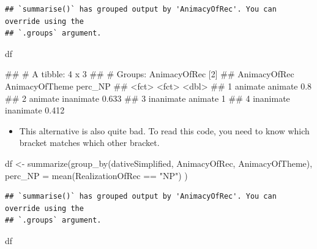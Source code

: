 \documentclass[
]{book}
\newenvironment{Shaded}{\begin{snugshade}}{\end{snugshade}}
\newcommand{\AttributeTok}[1]{\textcolor[rgb]{0.77,0.63,0.00}{#1}}
\newcommand{\FunctionTok}[1]{\textcolor[rgb]{0.00,0.00,0.00}{#1}}
\newcommand{\NormalTok}[1]{#1}
\newcommand{\OtherTok}[1]{\textcolor[rgb]{0.56,0.35,0.01}{#1}}
\newcommand{\SpecialCharTok}[1]{\textcolor[rgb]{0.00,0.00,0.00}{#1}}
\newcommand{\StringTok}[1]{\textcolor[rgb]{0.31,0.60,0.02}{#1}}
\providecommand{\tightlist}{%
  \setlength{\itemsep}{0pt}\setlength{\parskip}{0pt}}
\begin{document}
\begin{verbatim}
## `summarise()` has grouped output by 'AnimacyOfRec'. You can override using the
## `.groups` argument.
\end{verbatim}

\begin{Shaded}
\begin{Highlighting}[]
\NormalTok{df}
\end{Highlighting}
\end{Shaded}

\begin{Shaded}
\begin{Highlighting}[]
\NormalTok{\#\# \# A tibble: 4 x 3}
\NormalTok{\#\# \# Groups:   AnimacyOfRec [2]}
\NormalTok{\#\#   AnimacyOfRec AnimacyOfTheme perc\_NP}
\NormalTok{\#\#   \textless{}fct\textgreater{}        \textless{}fct\textgreater{}            \textless{}dbl\textgreater{}}
\NormalTok{\#\# 1 animate      animate          0.8  }
\NormalTok{\#\# 2 animate      inanimate        0.633}
\NormalTok{\#\# 3 inanimate    animate          1    }
\NormalTok{\#\# 4 inanimate    inanimate        0.412}
\end{Highlighting}
\end{Shaded}

\begin{itemize}
\tightlist
\item
  This alternative is also quite bad. To read this code, you need to know which bracket matches which other bracket.
\end{itemize}

\begin{Shaded}
\begin{Highlighting}[]
\NormalTok{df }\OtherTok{\textless{}{-}} \FunctionTok{summarize}\NormalTok{(}\FunctionTok{group\_by}\NormalTok{(dativeSimplified, AnimacyOfRec, AnimacyOfTheme), }
                  \AttributeTok{perc\_NP =} \FunctionTok{mean}\NormalTok{(RealizationOfRec }\SpecialCharTok{==} \StringTok{"NP"}\NormalTok{) )}
\end{Highlighting}
\end{Shaded}

\begin{verbatim}
## `summarise()` has grouped output by 'AnimacyOfRec'. You can override using the
## `.groups` argument.
\end{verbatim}

\begin{Shaded}
\begin{Highlighting}[]
\NormalTok{df}
\end{Highlighting}
\end{Shaded}
\end{document}
